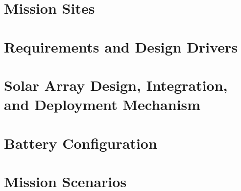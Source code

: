 \documentclass[%
    draft, %
    11pt,
    a4paper
]
{memoir}
\begin{document}
\chapter{Mission Sites}
\label{sec:MissionSites}


\chapter{Requirements and Design Drivers}
\label{sec:RequirementsAndDesignDrivers}



\chapter{Solar Array Design, Integration, and Deployment Mechanism}
\label{sec:SolarArrayDesign}


\chapter{Battery Configuration}
\label{sec:BatteryConfiguration}


\chapter{Mission Scenarios}
\label{sec:MissionScenarios}
\end{document}
